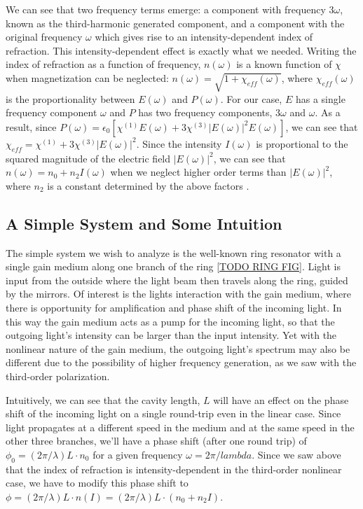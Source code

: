 \documentclass[12pt]{article}
\begin{document}
We can see that two frequency terms emerge: a component with frequency $3\omega$, known as
the third-harmonic generated component, and a component with the original frequency $\omega$
which gives rise to an intensity-dependent index of refraction. This intensity-dependent
effect is exactly what we needed. Writing the index of refraction as a function of
frequency, $n(\omega)$ is a known function of $\chi$ when magnetization can be neglected:
$n(\omega) = \sqrt{1 + \chi_{eff}(\omega)}$, where $\chi_{eff}(\omega)$ is the
proportionality between $E(\omega)$ and $P(\omega)$. For our case, $E$ has a single
frequency component $\omega$ and $P$ has two frequency components, $3\omega$ and
$\omega$. As a result, since
$P(\omega) = \epsilon_0[\chi^{(1)}E(\omega) + 3 \chi^{(3)}|E(\omega)|^2 E(\omega)]$, we can
see that $\chi_{eff} = \chi^{(1)} + 3\chi^{(3)}|E(\omega)|^2$. Since the intensity
$I(\omega)$ is proportional to the squared magnitude of the electric field $|E(\omega)|^2$,
we can see that $n(\omega) = n_0 + n_2I(\omega)$ when we neglect higher order terms than
$|E(\omega)|^2$, where $n_2$ is a constant determined by the above factors \cite{TODO
  BOYD}.
\subsection*{A Simple System and Some Intuition}
The simple system we wish to analyze is the well-known ring resonator with a single gain
medium along one branch of the ring \ref{TODO RING FIG}. Light is input from the outside
where the light beam then travels along the ring, guided by the mirrors. Of interest is the
lights interaction with the gain medium, where there is opportunity for amplification and
phase shift of the incoming light. In this way the gain medium acts as a pump for the
incoming light, so that the outgoing light's intensity can be larger than the input
intensity. Yet with the nonlinear nature of the gain medium, the outgoing light's spectrum
may also be different due to the possibility of higher frequency generation, as we saw with
the third-order polarization.

Intuitively, we can see that the cavity length, $L$ will have an effect on the phase shift
of the incoming light on a single round-trip even in the linear case. Since light propagates
at a different speed in the medium and at the same speed in the other three branches, we'll
have a phase shift (after one round trip) of $\phi_{0}=  (2\pi/\lambda) L \cdot n_0$ for a
given frequency $\omega = 2\pi/lambda$. Since
we saw above that the index of refraction is intensity-dependent in the third-order
nonlinear case, we have to modify this phase shift to $\phi = (2\pi/\lambda) L \cdot n(I) =
(2\pi/\lambda)L \cdot (n_0 + n_2I)$.
\end{document}
